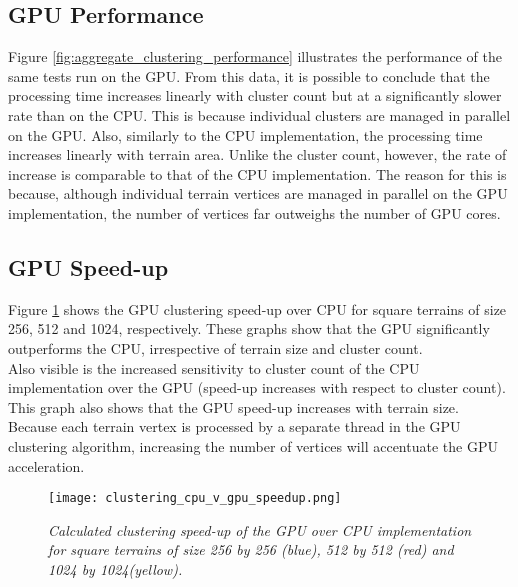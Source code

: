 \subsection{GPU Performance}

Figure \ref{fig:aggregate_clustering_performance} illustrates the performance of the same tests run on the GPU. From this data, it is possible to conclude that the processing time increases linearly with cluster count but at a significantly slower rate than on the CPU. This is because individual clusters are managed in parallel on the GPU. Also, similarly to the CPU implementation, the processing time increases linearly with terrain area. Unlike the cluster count, however, the rate of increase is comparable to that of the CPU implementation. The reason for this is because, although individual terrain vertices are managed in parallel on the GPU implementation, the number of vertices far outweighs the number of GPU cores. 

\subsection{GPU Speed-up}

Figure \ref{fig:clustering_cpu_v_gpu_speedup} shows the GPU clustering speed-up over CPU for square terrains of size 256, 512 and 1024, respectively. These graphs show that the GPU significantly outperforms the CPU, irrespective of terrain size and cluster count. \\
Also visible is the increased sensitivity to cluster count of the CPU implementation over the GPU (speed-up increases with respect to cluster count). \\
This graph also shows that the GPU speed-up increases with terrain size. Because each terrain vertex is processed by a separate thread in the GPU clustering algorithm, increasing the number of vertices will accentuate the GPU acceleration. \\

\begin{figure}
\center
	\texttt{[image: clustering\_cpu\_v\_gpu\_speedup.png]}
	\caption{ \textit{Calculated clustering speed-up of the GPU over CPU implementation for square terrains of size 256 by 256 (blue), 512 by 512 (red) and 1024 by 1024(yellow).}}	
	\label{fig:clustering_cpu_v_gpu_speedup}
\end{figure}